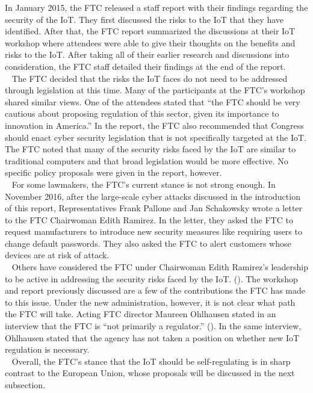 \documentclass[letterpaper, 12pt]{article}
\begin{document}
\begin{flushleft}
In January 2015, the FTC released a staff report with their findings regarding the security of the IoT. They first discussed the risks to the IoT that 
they have identified. After that, the FTC report summarized the discussions at their IoT workshop where attendees were able to give their thoughts on the
benefits and risks to the IoT. After taking all of their earlier research and discussions into consideration, the FTC staff detailed their findings at the
end of the report.\\
~\newline
The FTC decided that the risks the IoT faces do not need to be addressed through legislation at this time. Many of the participants at the FTC's workshop
shared similar views. One of the attendees stated that ``the FTC should be very cautious about proposing regulation of this sector, given its importance
to innovation in America.'' In the report, the FTC also recommended that Congress should enact cyber security legislation that is not specifically
targeted at the IoT. The FTC noted that many of the security risks faced by the IoT are similar to traditional computers and that broad legislation would
be more effective. No specific policy proposals were given in the report, however.\\
~\newline
For some lawmakers, the FTC's current stance is not strong enough. In November 2016, after the large-scale cyber attacks discussed in the introduction of this report,
Representatives Frank Pallone and Jan Schakowsky wrote a letter to the FTC Chairwoman Edith Ramirez. In the letter, they asked the FTC to request manufacturers to 
introduce new security measures like requiring users to change default passwords. They also asked the FTC to alert customers whose devices are at risk of
attack.\\
~\newline
Others have considered the FTC under Chairwoman Edith Ramirez's leadership to be active in addressing the security risks faced by the IoT. (\cite{Paul}). 
The workshop and report previously discussed are a few of the contributions the FTC has made to this issue. Under the new administration, however, it is
not clear what path the FTC will take. Acting FTC director Maureen Ohlhausen stated in an interview that the FTC is ``not primarily a regulator.'' (\cite{Thielman}). In the same interview, Ohlhausen stated that the agency has not taken a position on whether new IoT regulation is necessary.\\
~\newline 
Overall, the FTC's stance that the IoT should be self-regulating is in sharp contrast to the European Union, whose proposals will be discussed in the next subsection.


\end{flushleft}
\end{document}

